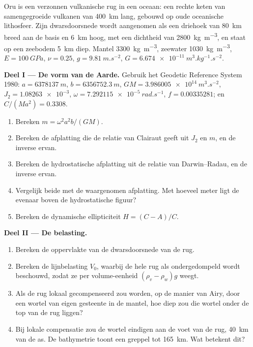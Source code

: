 \begin{problem}
\label{pb:b3:gravity-geodesy:1}
Oru is een verzonnen vulkanische rug in een oceaan: een rechte keten van samengegroeide
vulkanen van \qty{400}{km} lang, gebouwd op oude oceanische lithosfeer. Zijn
dwarsdoorsnede wordt aangenomen als een driehoek van \qty{80}{km} breed aan de basis en
\qty{6}{km} hoog, met een dichtheid van \qty{2800}{kg.m^{-3}}, en staat op een zeebodem
\qty{5}{km} diep. Mantel \qty{3300}{kg.m^{-3}}, zeewater
\qty{1030}{kg.m^{-3}}, $E = \qty{100}{GPa}$, $\nu = 0.25$, $g =
\qty{9.81}{m.s^{-2}}$, $G = \qty{6.674e-11}{m^3.kg^{-1}.s^{-2}}$.

\medskip
\noindent\textbf{Deel I --- De vorm van de Aarde.} Gebruik het Geodetic Reference
System 1980: $a = \qty{6378137}{m}$, $b = \qty{6356752.3}{m}$,
$GM = \qty{3.986005e14}{m^3.s^{-2}}$, $J_2 = \num{1.08263e-3}$,
$\omega = \qty{7.292115e-5}{rad.s^{-1}}$, $f = \num{0.00335281}$; en
$C/(Ma^2) = \num{0.3308}$.
\begin{enumerate}
  \item Bereken $m = \omega^2a^2b/(GM)$.
  \item Bereken de afplatting die de relatie van Clairaut geeft uit $J_2$ en
        $m$, en de inverse ervan.
  \item Bereken de hydrostatische afplatting uit de relatie van Darwin--Radau, en
        de inverse ervan.
  \item Vergelijk beide met de waargenomen afplatting. Met hoeveel meter ligt de
        evenaar boven de hydrostatische figuur?
  \item Bereken de dynamische ellipticiteit $H = (C - A)/C$.
\end{enumerate}

\noindent\textbf{Deel II --- De belasting.}
\begin{enumerate}[resume]
  \item Bereken de oppervlakte van de dwarsdoorsnede van de rug.
  \item Bereken de lijnbelasting $V_0$, waarbij de hele rug als ondergedompeld wordt beschouwd, zodat
        ze per volume-eenheid $(\rho_v - \rho_w)g$ weegt.
  \item Als de rug lokaal gecompenseerd zou worden, op de manier van Airy, door een wortel van
        eigen gesteente in de mantel, hoe diep zou die wortel onder de
        top van de rug liggen?
  \item Bij lokale compensatie zou de wortel eindigen aan de voet van de rug,
        \qty{40}{km} van de as. De bathymetrie toont een greppel tot
        \qty{165}{km}. Wat betekent dit?
\end{enumerate}


\end{problem}
